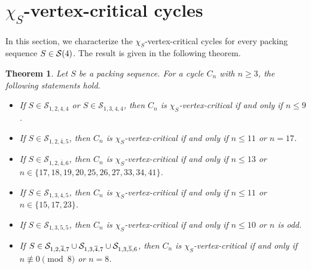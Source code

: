 \documentclass[12pt]{article}
\newtheorem{theorem}{Theorem}[section]
\newcommand{\cS}{{\cal S}}
\begin{document}
\section{$\chi_S$-vertex-critical cycles} \label{sec:vertex-critical-cycles}
In this section, we characterize the $\chi_S$-vertex-critical cycles for every packing sequence $S \in \cS(4)$.
The result is given in the following theorem.
   \begin{theorem} \label{thm:vertexcritical} Let $S$ be a packing sequence. For a cycle $C_n$ with $n \ge 3$, the following statements hold.

    \begin{itemize} 
    
    \item[$(i)$] If $S \in \mathcal{S}_{1,2,4,4}$ or  $S \in \mathcal{S}_{1,3,4,4}$, then $C_n$ is $\chi_S$-vertex-critical if and only if $n \leq 9$.
    
    \item[$(ii)$] If $S \in \mathcal{S}_{1,2,\overline{4},5}$, then $C_n$ is $\chi_S$-vertex-critical if and only if $n \leq 11$ or $n = 17$.
    
    \item[$(iii)$] If $S \in \mathcal{S}_{1,2,\overline{4},6}$, then $C_n$ is $\chi_S$-vertex-critical if and only if $n \leq 13 $ or $n \in \{17, 18, 19, 20, 25, 26, 27, 33, 34, 41\}$.        
	
	\item[$(iv)$] If $S \in \mathcal{S}_{1,3,4,5}$, then $C_n$ is $\chi_S$-vertex-critical if and only if $n \leq 11 $ or $n \in \{15,  17, 23\}$.
		
	\item[$(v)$] 	If $S \in \mathcal{S}_{1,3,5,5}$, then $C_n$ is $\chi_S$-vertex-critical if and only if $n \leq 10 $ or $n$ is odd.

 
      \item[$(vi)$] If $S \in \mathcal{S}_{1,2,\overline{4},7} \cup \cS_{1,3,\overline{4},7} \cup \cS_{1,3,\overline{5}, 6}$, then $C_n$ is $\chi_S$-vertex-critical if and only if 
$n \not\equiv 0 \pmod{8}$ or $n = 8$. 
\end{itemize}
    \end{theorem} 
\end{document}
